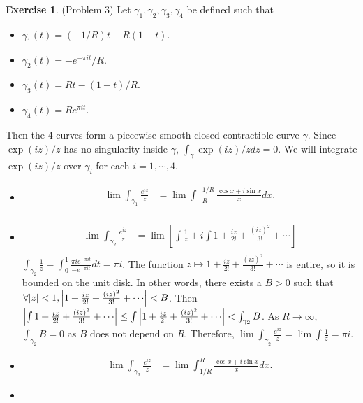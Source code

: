 \documentclass[12pt, psamsfonts]{amsart}
\theoremstyle{definition}
\newtheorem*{exer}{Exercise}
\theoremstyle{remark}
\numberwithin{equation}{section}
\begin{document}
\begin{exer}{(Problem 3)}
  Let $\gamma_1, \gamma_2, \gamma_3, \gamma_4$ be defined such that
  \begin{itemize}
    \item
      $\gamma_1(t) = (-1/R)t - R(1 - t)$.
    \item
      $\gamma_2(t) = -e^{-\pi i t}/R$.
    \item
      $\gamma_3(t) = Rt - (1 - t) / R$.
    \item
      $\gamma_4(t) = Re^{\pi it}$.
  \end{itemize}
  Then the 4 curves form a piecewise smooth closed contractible curve $\gamma$.
  Since $\exp(iz) / z$ has no singularity inside $\gamma$, $\int_{\gamma} \exp(iz) / z dz = 0$.
  We will integrate $\exp(iz) / z$ over $\gamma_i$ for each $i = 1, \cdots, 4$.
  \begin{itemize}
    \item
      \begin{align*}
        \lim \int_{\gamma_1} \frac{e^{iz}}{z}
          &= \lim \int_{-R}^{-1/R} \frac{\cos x + i\sin x}{x} dx. \\
      \end{align*}
    \item
      \begin{align*}
        \lim \int_{\gamma_2} \frac{e^{iz}}{z}
          &= \lim [\int \frac{1}{z} + i\int 1 + \frac{iz}{2!} + \frac{(iz)^2}{3!} + \cdots] \\
      \end{align*}
      $\int_{\gamma_2} \frac{1}{z} = \int_{0}^{1} \frac{\pi i e^{-\pi i t}}{-e^{-\pi i t}} dt = \pi i$.
      The function $z \mapsto 1 + \frac{iz}{2!} + \frac{(iz)^2}{3!} + \cdots$ is entire, so it is bounded on the unit disk.
      In other words, there exists a $B > 0$ such that $\forall \abs{z} < 1, \abs{1 + \frac{iz}{2!} + \frac{(iz)^2}{3!} + \cdots} < B$.
      Then $\abs{\int 1 + \frac{iz}{2!} + \frac{(iz)^2}{3!} + \cdots} \leq \int\abs{1 + \frac{iz}{2!} + \frac{(iz)^2}{3!} + \cdots} < \int_{\gamma_2} B$.
      As $R \rightarrow \infty$, $\int_{\gamma_2} B = 0$ as $B$ does not depend on $R$.
      Therefore, $\lim \int_{\gamma_2} \frac{e^{iz}}{z} = \lim \int \frac{1}{z} = \pi i$.
    \item
      \begin{align*}
        \lim \int_{\gamma_3} \frac{e^{iz}}{z}
          &= \lim \int_{1/R}^{R} \frac{\cos x + i\sin x}{x} dx.
      \end{align*}
    \item

\end{itemize}
\end{exer}
\end{document}
